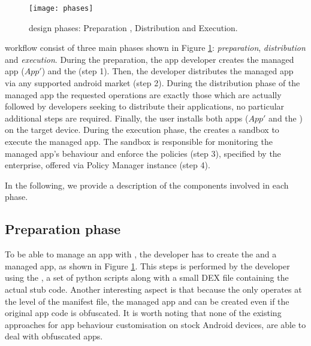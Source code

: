 \iffalse
\begin{figure}[H]
\centering
\texttt{[image: lightboxmodel]}
\caption{\asd enforcing managed apps}
\label{fig:lightmodel}
\end{figure}
\fi

\begin{figure}[H]
\centering
\texttt{[image: phases]}
\caption{\asd design phases: Preparation , Distribution and Execution.}
\label{fig:sysdesign}
\end{figure}


\asd workflow consist of three main phases shown in Figure \ref{fig:sysdesign}: \textit{preparation}, \textit{distribution} and \textit{execution}.
During the preparation, the app developer creates the managed app ($App'$) and the \stub (step 1). Then, the developer distributes the managed app via any supported android market (step 2). During the distribution phase of the managed app the 
requested operations are exactly those which are actually followed by developers seeking to distribute their applications, no particular additional steps are required. Finally,  the user installs both  apps ($App'$ and the \stub) on the target device. During the execution phase, the \stub creates a sandbox to execute the managed app. The sandbox is responsible for monitoring the managed app's behaviour and enforce the policies (step 3), specified by the enterprise, offered via \asd Policy Manager instance (step 4). 

In the following, we provide a description of the components involved in each phase.

\subsection{Preparation phase} \label{sec:stubfactory}
To be able to manage an app with \asd, the developer has to create the \stub and a managed app, as shown in Figure \ref{fig:sysdesign}. This steps is performed by the developer using the \stubMaker, a set of python scripts along with a small DEX file containing the actual stub code.   
Another interesting aspect is that because the \stubMaker only operates at the level of the manifest file, the managed app and \stub can be created even if the original app code is obfuscated. 
It is worth noting that none of the existing approaches for app behaviour customisation on stock Android devices, are able to deal with obfuscated apps. 

